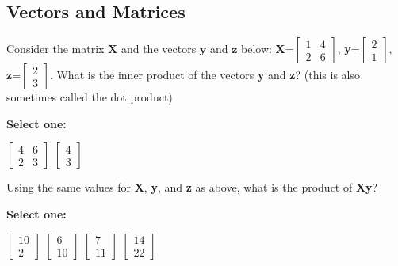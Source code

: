 \documentclass[11pt,addpoints,answers]{exam}
\numberwithin{equation}{section} %
\numberwithin{figure}{section} %
\numberwithin{table}{section} %
\begin{document}
\subsection{Vectors and Matrices}
\begin{questions}

    \question[1] Consider the matrix $\mathbf{X}$ and the vectors $\mathbf{y}$ and $\mathbf{z}$ below: \textbf{X}=$\begin{bmatrix} 1 & 4 \\ 2 & 6 \end{bmatrix}$, \textbf{y}=$\begin{bmatrix} 2 \\ 1 \end{bmatrix}$, \textbf{z}=$\begin{bmatrix} 2 \\ 3 \end{bmatrix}$. What is the inner product of the vectors \textbf{y} and \textbf{z}? (this is also sometimes called the dot product)

    \textbf{Select one:}
    \begin{checkboxes}
        \choice $\begin{bmatrix} 4 & 6 \\ 2 & 3 \end{bmatrix}$
        \choice $\begin{bmatrix} 4 \\ 3 \end{bmatrix}$
    \end{checkboxes}


    \question[1] Using the same values for \textbf{X}, \textbf{y}, and \textbf{z} as above, what is the product of \textbf{Xy}?

    \textbf{Select one:}
    \begin{checkboxes}
        \choice $\begin{bmatrix} 10 \\ 2 \end{bmatrix}$
        \choice $\begin{bmatrix} 6 \\ 10 \end{bmatrix}$
        \choice $\begin{bmatrix} 7 \\ 11 \end{bmatrix}$
        \choice $\begin{bmatrix} 14 \\ 22 \end{bmatrix}$
    \end{checkboxes}



\end{questions}
\end{document}
